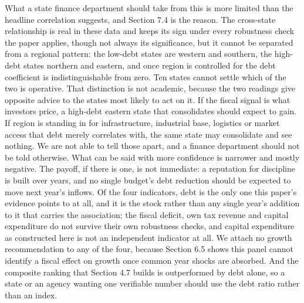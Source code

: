 \documentclass[12pt,a4paper]{article}
\begin{document}
What a state finance department should take from this is more limited than the headline correlation suggests, and Section 7.4 is the reason. The cross-state relationship is real in these data and keeps its sign under every robustness check the paper applies, though not always its significance, but it cannot be separated from a regional pattern: the low-debt states are western and southern, the high-debt states northern and eastern, and once region is controlled for the debt coefficient is indistinguishable from zero. Ten states cannot settle which of the two is operative. That distinction is not academic, because the two readings give opposite advice to the states most likely to act on it. If the fiscal signal is what investors price, a high-debt eastern state that consolidates should expect to gain. If region is standing in for infrastructure, industrial base, logistics or market access that debt merely correlates with, the same state may consolidate and see nothing. We are not able to tell those apart, and a finance department should not be told otherwise. What can be said with more confidence is narrower and mostly negative. The payoff, if there is one, is not immediate: a reputation for discipline is built over years, and no single budget's debt reduction should be expected to move next year's inflows. Of the four indicators, debt is the only one this paper's evidence points to at all, and it is the stock rather than any single year's addition to it that carries the association; the fiscal deficit, own tax revenue and capital expenditure do not survive their own robustness checks, and capital expenditure as constructed here is not an independent indicator at all. We attach no growth recommendation to any of the four, because Section 6.5 shows this panel cannot identify a fiscal effect on growth once common year shocks are absorbed. And the composite ranking that Section 4.7 builds is outperformed by debt alone, so a state or an agency wanting one verifiable number should use the debt ratio rather than an index.
\end{document}
